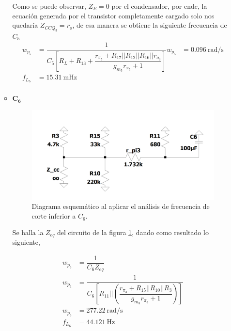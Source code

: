 \begin{enumerate}
\begin{itemize}
                Como se puede observar, $Z_E=0$ por el condensador, por ende, la ecuación generada por el transistor completamente cargado solo nos quedaría $Z_{CCQ_3}=r_o$, de esa manera se obtiene la siguiente frecuencia de $C_5$
                \begin{align*}
                  w_{p_5} & =\dfrac{1}{C_5[R_L+R_{13}+\dfrac{r_{\pi_5}+R_{17}||R_{12}||R_{16}||r_{o_3}}{g_{m_5}r_{\pi_5}+1}]}
                  w_{p_5} & = \SI{0.096}{\radian\per\second}                                                                  \\[0.2cm]
                  f_{L_5} & = \SI{15.31}{\milli\hertz}                                                                        \\[0.2cm]
                \end{align*}
                \newpage
          \item $\mathbf{C_6}$

                \begin{figure}[H]
                  \centering
                  \includegraphics[width=12cm]{Imagenes/c6.png}
                  \caption{Diagrama esquemático al aplicar el análisis de frecuencia de corte inferior a $C_6$.}
                  \label{fig:c6}
                \end{figure}

                Se halla la $Z_{eq}$ del circuito de la figura \ref{fig:c6}, dando como resultado lo siguiente,

                \begin{align*}
                  w_{p_6} & =\dfrac{1}{C_6Z_{eq}}                                                                             \\[0.2cm]
                  w_{p_6} & =\dfrac{1}{C_6[R_{11}||\left(\dfrac{r_{\pi_3}+R_{15}||R_{10}||R_{3}}{g_{m_3}r_{\pi_3}+1}\right)]} \\[0.2cm]
                  w_{p_6} & = \SI{277.22}{\radian\per\second}                                                                 \\[0.2cm]
                  f_{L_6} & = \SI{44.121}{\hertz}                                                                             \\[0.2cm]
                \end{align*}


\end{itemize}
\end{enumerate}
